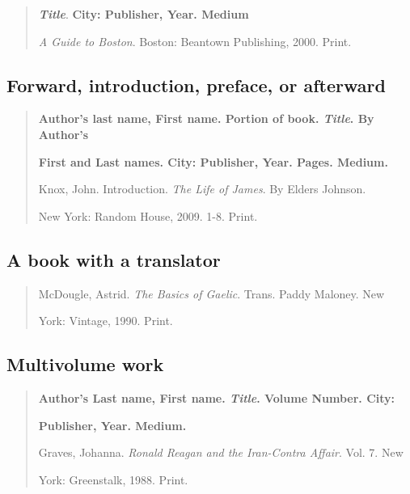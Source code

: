 \begin{quote}
\emph{\textbf{Title}}. \textbf{City: Publisher, Year. Medium}

\medskip
\emph{A Guide to Boston}. Boston: Beantown Publishing, 2000. Print.
\end{quote}

\subsection{Forward, introduction, preface, or afterward}
\begin{quote}

\textbf{Author's last name, First name. Portion of book. \emph{Title}. By Author's} 

\hspace{.4in}\textbf{First and Last names. City: Publisher, Year. Pages. Medium.}

\medskip
Knox, John. Introduction. \emph{The Life of James}. By Elders Johnson.

\hspace{.4in}New York: Random House, 2009. 1-8. Print.

\end{quote}

\subsection{A book with a translator} 
\begin{quote}
McDougle, Astrid. \emph{The Basics of Gaelic}. Trans. Paddy Maloney. New

\hspace{.4in}York: Vintage, 1990. Print.
\end{quote}


\subsection{Multivolume work}
\begin{quote}

\textbf{Author's Last name, First name. \emph{Title}. Volume Number. City: }

\hspace{.4in}\textbf{Publisher, Year. Medium.}
\medskip

Graves, Johanna. \emph{Ronald Reagan and the Iran-Contra Affair}. Vol. 7. New 

\hspace{.4in}York: Greenstalk, 1988. Print.
\end{quote}


